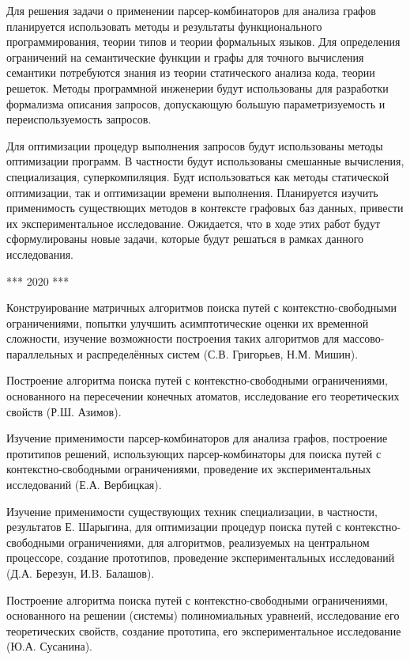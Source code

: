 \documentclass[12pt]{article}  %
\theoremstyle{remark}
\begin{document}
Для решения задачи о применении парсер-комбинаторов для анализа графов планируется использовать методы и результаты функционального программирования, теории типов и теории формальных языков. Для определения ограничений на семантические функции и графы для точного вычисления семантики потребуются знания из теории статического анализа кода, теории решеток. Методы программной инженерии будут использованы для разработки формализма описания запросов, допускающую большую параметризуемость и переиспользуемость запросов.

Для оптимизации процедур выполнения запросов будут использованы методы оптимизации программ. В частности будут использованы смешанные вычисления, специализация, суперкомпиляция. Будт использоваться как методы статической оптимизации, так и оптимизации времени выполнения. Планируется изучить применимость существющих методов в контексте графовых баз данных, привести их экспериментальное исследование. Ожидается, что в ходе этих работ будут сформулированы новые задачи, которые будут решаться в рамках данного исследования.

*** 2020 ***

Конструирование матричных алгоритмов поиска путей с контекстно-свободными ограничениями, попытки улучшить асимптотические оценки их временной сложности, изучение возможности построения таких алгоритмов для массово-параллельных и распределённых систем (С.В. Григорьев, Н.М. Мишин).

Построение алгоритма поиска путей с контекстно-свободными ограничениями, основанного на пересечении конечных атоматов, исследование его теоретических свойств (Р.Ш. Азимов).

Изучение применимости парсер-комбинаторов для анализа графов, построение протитипов решений, использующих парсер-комбинаторы для поиска путей с контекстно-свободными ограничениями, проведение их экспериментальных исследований (Е.А. Вербицкая).

Изучение применимости существующих техник специализации, в частности, результатов Е. Шарыгина, для оптимизации процедур поиска путей с контекстно-свободными ограничениями, для алгоритмов, реализуемых на центральном процессоре, создание прототипов, проведение экспериментальных исследований (Д.А. Березун, И.B. Балашов).

Построение алгоритма поиска путей с контекстно-свободными ограничениями, основанного на решении (системы) полиномиальных уравнеий, исследование его теоретических свойств, создание прототипа, его экспериментальное исследование (Ю.А. Сусанина).
\end{document}
